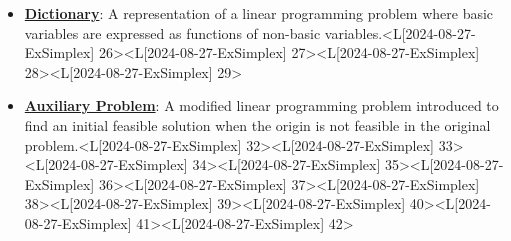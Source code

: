 \documentclass{article}%
\begin{document}
\begin{itemize}[[leftmargin=*]]
\item \href{https://www.math.purdue.edu/~yipn/421/2024-08-27-ExSimplex.pdf#page=26}{\textbf{Dictionary}}: A representation of a linear programming problem where basic variables are expressed as functions of non-basic variables.<L[2024-08-27-ExSimplex] 26><L[2024-08-27-ExSimplex] 27><L[2024-08-27-ExSimplex] 28><L[2024-08-27-ExSimplex] 29>%
\item \href{https://www.math.purdue.edu/~yipn/421/2024-08-27-ExSimplex.pdf#page=32}{\textbf{Auxiliary Problem}}: A modified linear programming problem introduced to find an initial feasible solution when the origin is not feasible in the original problem.<L[2024-08-27-ExSimplex] 32><L[2024-08-27-ExSimplex] 33><L[2024-08-27-ExSimplex] 34><L[2024-08-27-ExSimplex] 35><L[2024-08-27-ExSimplex] 36><L[2024-08-27-ExSimplex] 37><L[2024-08-27-ExSimplex] 38><L[2024-08-27-ExSimplex] 39><L[2024-08-27-ExSimplex] 40><L[2024-08-27-ExSimplex] 41><L[2024-08-27-ExSimplex] 42>%
\end{itemize}%
\newpage

%
\end{document}
